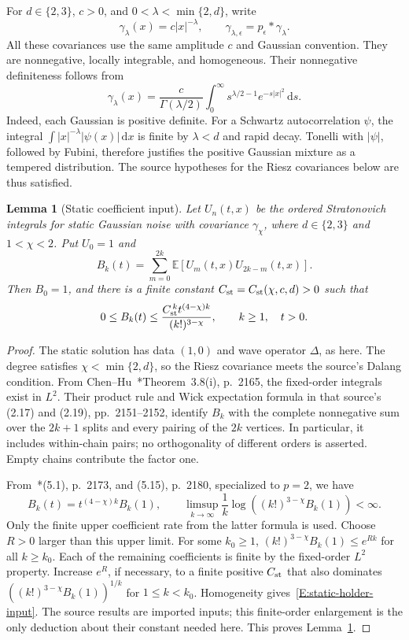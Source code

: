 \documentclass[12pt]{article}
\numberwithin{equation}{section}
\newtheorem{lemma}[theorem]{Lemma}
\theoremstyle{definition}
\newcommand{\E}{\mathbb{E}}
\newcommand{\ud}{\,\mathrm{d}}
\begin{document}
For $d \in \{2,3\}$, $c > 0$, and $0 < \lambda < \min\{2,d\}$, write
\[
  \gamma_\lambda(x)=c|x|^{-\lambda},\qquad
  \gamma_{\lambda,\epsilon}=p_\epsilon*\gamma_\lambda.
\]
All these covariances use the same amplitude $c$ and Gaussian convention.
They are nonnegative, locally integrable, and homogeneous. Their nonnegative
definiteness follows from
\[
  \gamma_\lambda(x)=\frac{c}{\Gamma(\lambda/2)}
  \int_0^\infty s^{\lambda/2-1}e^{-s|x|^2}\ud s.
\]
Indeed, each Gaussian is positive definite. For a Schwartz autocorrelation
$\psi$, the integral $\int |x|^{-\lambda}|\psi(x)|\ud x$ is finite by
$\lambda < d$ and rapid decay. Tonelli with $|\psi|$, followed by Fubini,
therefore justifies the positive Gaussian mixture as a tempered distribution.
The source hypotheses for the Riesz covariances below are thus satisfied.

\begin{lemma}[Static coefficient input]\label{L:static-holder-input}
  Let $U_n(t,x)$ be the ordered Stratonovich integrals for static Gaussian
  noise with covariance $\gamma_\chi$, where
  $d \in \{2,3\}$ and $1 < \chi < 2$. Put $U_0=1$ and
  \[
    B_k(t)=\sum_{m=0}^{2k}\E[U_m(t,x)U_{2k-m}(t,x)].
  \]
  Then $B_0=1$, and there is a finite constant
  $C_{\rm st}=C_{\rm st}(\chi,c,d)>0$ such that
  \begin{equation}\label{E:static-holder-input}
    0\le B_k(t)\le
    \frac{C_{\rm st}^{\,k}t^{(4-\chi)k}}{(k!)^{3-\chi}},
    \qquad k\ge1,\quad t>0.
  \end{equation}
\end{lemma}

\begin{proof}
  The static solution has data $(1,0)$ and wave operator $\Delta$, as here.
  The degree satisfies $\chi<\min\{2,d\}$, so the Riesz covariance meets
  the source's Dalang condition. From
  Chen--Hu~\cite{chen.hu:25:hyperbolic}*{Theorem~3.8(i), p.~2165},
  the fixed-order integrals exist in $L^2$. Their product rule and Wick
  expectation formula in that source's (2.17) and (2.19),
  pp.~2151--2152, identify $B_k$ with the complete nonnegative sum over
  the $2k+1$ splits and every pairing of the $2k$ vertices. In particular,
  it includes within-chain pairs; no orthogonality of different orders
  is asserted. Empty chains contribute the factor one.

  From~\cite{chen.hu:25:hyperbolic}*{(5.1), p.~2173, and (5.15), p.~2180},
  specialized to $p=2$, we have
  \[
    B_k(t)=t^{(4-\chi)k}B_k(1),\qquad
    \limsup_{k\to\infty}\frac1k
    \log\left((k!)^{3-\chi}B_k(1)\right)<\infty.
  \]
  Only the finite upper coefficient rate from the latter formula is
  used. Choose $R>0$ larger than this upper limit. For some $k_0\ge1$,
  $(k!)^{3-\chi}B_k(1)\le e^{Rk}$ for all $k\ge k_0$.
  Each of the remaining coefficients is finite by the fixed-order
  $L^2$ property. Increase $e^R$, if necessary, to a finite positive
  $C_{\rm st}$ that also dominates
  $\left((k!)^{3-\chi}B_k(1)\right)^{1/k}$ for $1\le k<k_0$.
  Homogeneity gives~\eqref{E:static-holder-input}. The source results
  are imported inputs; this finite-order enlargement is the only
  deduction about their constant needed here. This proves
  Lemma~\ref{L:static-holder-input}.
\end{proof}
\end{document}
